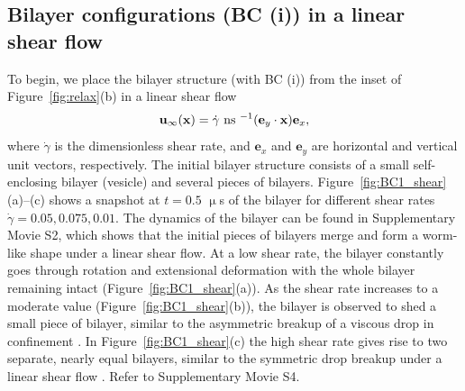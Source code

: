 \documentclass[prb,preprint,showpacs,preprintnumbers,amsmath,amssymb,longbibliography]{revtex4-1}
\newcommand{\ee}{\mathbf{e}}
\newcommand{\xx}{\mathbf{x}}
\newcommand{\uu}{\mathbf{u}}
\begin{document}
\subsection{Bilayer configurations (BC (i)) in a linear shear flow}
To begin, we place the bilayer structure (with BC (i)) from the inset of
Figure~\ref{fig:relax}(b) in a linear shear flow
\begin{equation}
\uu_\infty(\xx) = \dot\gamma \text{ ns }^{-1} ({\bf e}_y \cdot \mathbf{x}) {\bf e}_x,
\end{equation}
%
where $\dot\gamma$ is the dimensionless shear rate, and ${\ee}_x$ and
${\ee}_y$ are horizontal and vertical unit vectors, respectively. The
initial bilayer structure consists of a small self-enclosing bilayer
(vesicle) and several pieces of bilayers.
Figure~\ref{fig:BC1_shear}(a)--(c) shows a snapshot at $t = 0.5$
$\upmu$s of the bilayer for different shear rates $\dot\gamma=
0.05,0.075,0.01$. The dynamics of the bilayer can be found in
Supplementary Movie S2, which shows
that the initial pieces of bilayers
merge and form a worm-like shape under a linear shear flow. At a low
shear rate, the bilayer constantly goes through rotation and extensional
deformation with the whole bilayer remaining intact
(Figure~\ref{fig:BC1_shear}(a)). As the shear rate increases to a
moderate value (Figure~\ref{fig:BC1_shear}(b)), the bilayer is observed
to shed a small piece of bilayer, similar to the asymmetric breakup of a
viscous drop in confinement \cite{DuFuZhuMaLi2016_AICHEJ}.
In Figure~\ref{fig:BC1_shear}(c) the high shear rate gives rise to two
separate, nearly equal bilayers, similar to the symmetric drop breakup
under a linear shear flow \cite{Stone1994_ARFM}. 
Refer to Supplementary Movie S4.

\end{document}
